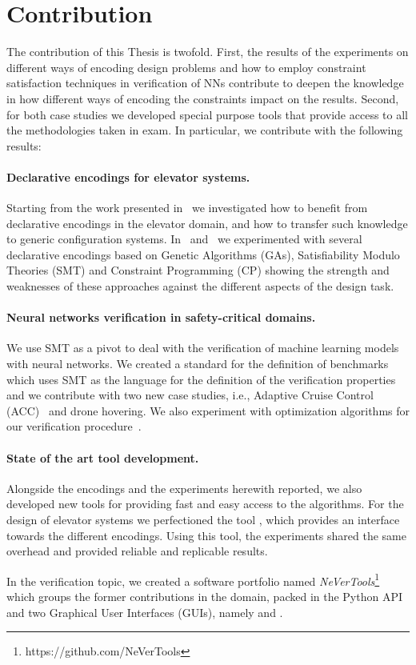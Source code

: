 \section{Contribution}
\label{sec:contribution}

The contribution of this Thesis is twofold. First, the results of the
experiments on different ways of encoding design problems and how to
employ constraint satisfaction techniques in verification of NNs contribute
to deepen the knowledge in how different ways of encoding the constraints
impact on the results. Second, for both case studies we developed special
purpose tools that provide access to all the methodologies taken in exam.
In particular, we contribute with the following results:

\paragraph{Declarative encodings for elevator systems.}
Starting from the work presented in~\cite{AiLift2} we investigated how to
benefit from declarative encodings in the elevator domain, and how to
transfer such knowledge to generic configuration systems. In~\cite{AiLift3}
and~\cite{AiLift4} we experimented with several declarative encodings based
on Genetic Algorithms (GAs), Satisfiability Modulo Theories (SMT) and 
Constraint Programming (CP) showing the strength and weaknesses of these
approaches against the different aspects of the design task.

\paragraph{Neural networks verification in safety-critical domains.}
We use SMT as a pivot to deal with the verification of machine learning 
models with neural networks. We created a standard for the definition
of benchmarks which uses SMT as the language for the definition of the
verification properties~\cite{vnnlib} and we contribute with two new case
studies, i.e., Adaptive Cruise Control (ACC)~\cite{DBLP:conf/ecms/DemarchiGPT22}
and drone hovering. We also experiment with optimization algorithms for
our verification procedure~\cite{DBLP:conf/cpsschool/DemarchiG22}.

\paragraph{State of the art tool development.}
Alongside the encodings and the experiments herewith reported, we also
developed new tools for providing fast and easy access to the algorithms.
For the design of elevator systems we perfectioned the tool \liftcreate,
which provides an interface towards the different encodings. Using this
tool, the experiments shared the same overhead and provided reliable and
replicable results.

In the verification topic, we created a software portfolio named
\textit{NeVerTools}\footnote{https://github.com/NeVerTools} which groups
the former contributions in the domain, packed in the \pynever{} Python API
and two Graphical User Interfaces (GUIs), namely \coconet{} and \nevertwo.